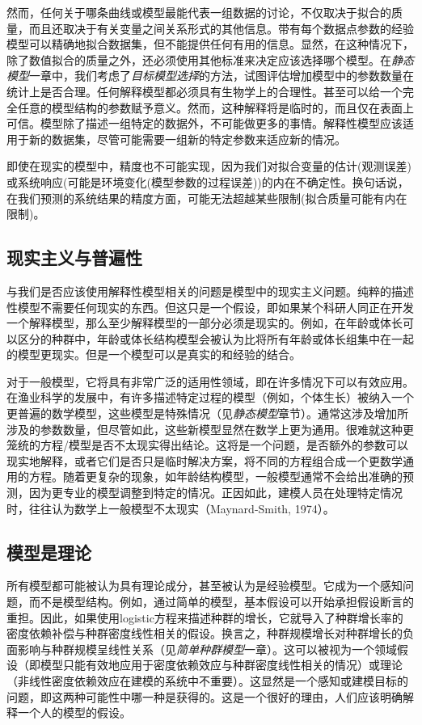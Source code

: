 \documentclass[
  lang=cn,
  11pt,
  scheme=chinese,
  chinesefont=nofont,
  citestyle=gb7714-2015,
  bibstyle=gb7714-2015]{elegantbook}
\begin{document}
然而，任何关于哪条曲线或模型最能代表一组数据的讨论，不仅取决于拟合的质量，而且还取决于有关变量之间关系形式的其他信息。带有每个数据点参数的经验模型可以精确地拟合数据集，但不能提供任何有用的信息。显然，在这种情况下，除了数值拟合的质量之外，还必须使用其他标准来决定应该选择哪个模型。在\emph{静态模型}一章中，我们考虑了\emph{目标模型选择}的方法，试图评估增加模型中的参数数量在统计上是否合理。任何解释模型都必须具有生物学上的合理性。甚至可以给一个完全任意的模型结构的参数赋予意义。然而，这种解释将是临时的，而且仅在表面上可信。模型除了描述一组特定的数据外，不可能做更多的事情。解释性模型应该适用于新的数据集，尽管可能需要一组新的特定参数来适应新的情况。

即使在现实的模型中，精度也不可能实现，因为我们对拟合变量的估计(观测误差)或系统响应(可能是环境变化(模型参数的过程误差))的内在不确定性。换句话说，在我们预测的系统结果的精度方面，可能无法超越某些限制(拟合质量可能有内在限制)。

\subsection{现实主义与普遍性}\label{ux73b0ux5b9eux4e3bux4e49ux4e0eux666eux904dux6027}

与我们是否应该使用解释性模型相关的问题是模型中的现实主义问题。纯粹的描述性模型不需要任何现实的东西。但这只是一个假设，即如果某个科研人同正在开发一个解释模型，那么至少解释模型的一部分必须是现实的。例如，在年龄或体长可以区分的种群中，年龄或体长结构模型会被认为比将所有年龄或体长组集中在一起的模型更现实。但是一个模型可以是真实的和经验的结合。

对于一般模型，它将具有非常广泛的适用性领域，即在许多情况下可以有效应用。在渔业科学的发展中，有许多描述特定过程的模型（例如，个体生长）被纳入一个更普遍的数学模型，这些模型是特殊情况（见\emph{静态模型}章节）。通常这涉及增加所涉及的参数数量，但尽管如此，这些新模型显然在数学上更为通用。很难就这种更笼统的方程/模型是否不太现实得出结论。这将是一个问题，是否额外的参数可以现实地解释，或者它们是否只是临时解决方案，将不同的方程组合成一个更数学通用的方程。随着更复杂的现象，如年龄结构模型，一般模型通常不会给出准确的预测，因为更专业的模型调整到特定的情况。正因如此，建模人员在处理特定情况时，往往认为数学上一般模型不太现实（Maynard-Smith, 1974）。

\subsection{模型是理论}\label{ux6a21ux578bux662fux7406ux8bba}

所有模型都可能被认为具有理论成分，甚至被认为是经验模型。它成为一个感知问题，而不是模型结构。例如，通过简单的模型，基本假设可以开始承担假设断言的重担。因此，如果使用logistic方程来描述种群的增长，它就导入了种群增长率的密度依赖补偿与种群密度线性相关的假设。换言之，种群规模增长对种群增长的负面影响与种群规模呈线性关系（见\emph{简单种群模型}一章）。这可以被视为一个领域假设（即模型只能有效地应用于密度依赖效应与种群密度线性相关的情况）或理论（非线性密度依赖效应在建模的系统中不重要）。这显然是一个感知或建模目标的问题，即这两种可能性中哪一种是获得的。这是一个很好的理由，人们应该明确解释一个人的模型的假设。
\end{document}
